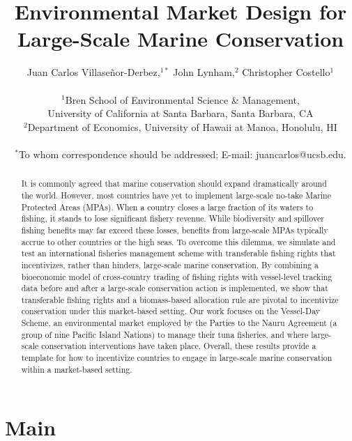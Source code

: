 \documentclass[12pt]{article}
\title{Environmental Market Design for Large-Scale Marine Conservation}
\author{Juan Carlos Villase\~{n}or-Derbez,$^{1\ast}$ John Lynham,$^{2}$ Christopher Costello$^{1}$\\
\\
\normalsize{$^{1}$Bren School of Environmental Science \& Management,}\\
\normalsize{University of California at Santa Barbara, Santa Barbara, CA}\\
\normalsize{$^{2}$Department of Economics, University of Hawaii at Manoa, Honolulu, HI}\\
\\
\normalsize{$^\ast$To whom correspondence should be addressed; E-mail: juancarlos@ucsb.edu.}
}
\date{}
\begin{document}

\baselineskip24pt


\maketitle



\begin{abstract}
It is commonly agreed that marine conservation should expand dramatically around the world. However, most countries have yet to implement large-scale no-take Marine Protected Areas (MPAs). When a country closes a large fraction of its waters to fishing, it stands to lose significant fishery revenue. While biodiversity and spillover fishing benefits may far exceed these losses, benefits from large-scale MPAs typically accrue to other countries or the high seas. To overcome this dilemma, we simulate and test an international fisheries management scheme with transferable fishing rights that incentivizes, rather than hinders, large-scale marine conservation. By combining a bioeconomic model of cross-country trading of fishing rights with vessel-level tracking data before and after a large-scale conservation action is implemented, we show that transferable fishing rights and a biomass-based allocation rule are pivotal to incentivize conservation under this market-based setting. Our work focuses on the Vessel-Day Scheme, an environmental market employed by the Parties to the Nauru Agreement (a group of nine Pacific Island Nations) to manage their tuna fisheries, and where large-scale conservation interventions have taken place. Overall, these results provide a template for how to incentivize countries to engage in large-scale marine conservation within a market-based setting.
\end{abstract}

\clearpage

\section{Main}
\end{document}
